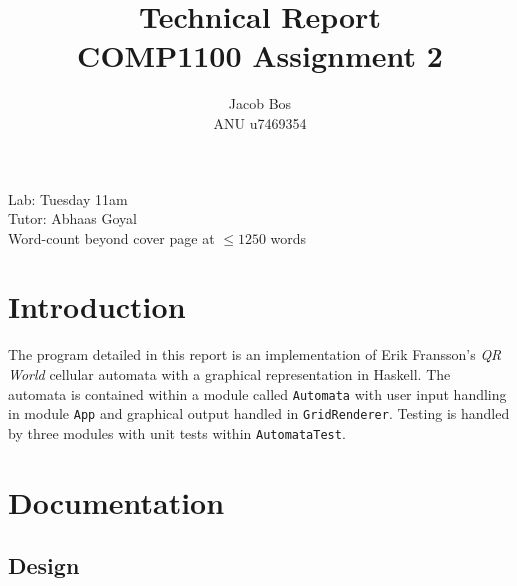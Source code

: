 \documentclass[11pt]{article}
\title{Technical Report\\ COMP1100 Assignment 2}
\author{Jacob Bos\\ ANU u7469354}
\begin{document}
\maketitle
{}
\begin{center}
  Lab: Tuesday 11am\\
  Tutor: Abhaas Goyal\\
  Word-count beyond cover page at $\leq 1250$ words
\end{center}
\tableofcontents
\newpage
{}
\section{Introduction} 
The program detailed in this report is an implementation of Erik Fransson's \textit{QR World} cellular automata with a graphical representation in Haskell. The automata is contained within a module called \verb|Automata| with user input handling in module \verb|App| and graphical output handled in \verb|GridRenderer|. Testing is handled by three modules with unit tests within \verb|AutomataTest|.


\section{Documentation}%
\subsection{Design}
\end{document}
